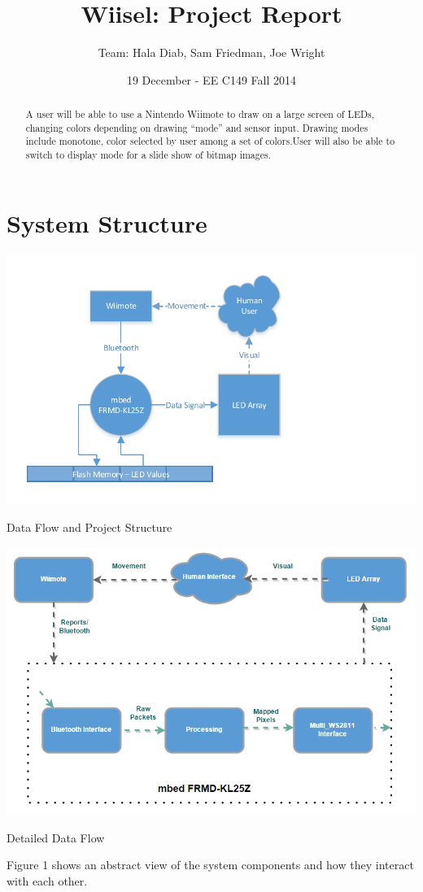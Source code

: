 \documentclass{tufte-handout}
\title{Wiisel: Project Report}
\author{Team: Hala Diab, Sam Friedman, Joe Wright}
\date{19 December - EE C149 Fall 2014}
\begin{document}
\maketitle
\begin{abstract}
    A user will be able to use a Nintendo Wiimote to draw on a large screen of
LEDs, changing colors depending
on drawing ``mode'' and sensor input. Drawing modes include monotone, color selected by user among a set of colors.User will also be able to switch to display mode for a slide show of bitmap images.
\end{abstract}

\section{\textbf{System Structure}}
\begin{marginfigure}
    \includegraphics[trim=1cm 0cm 4cm 0cm, width=\linewidth]{dataflow.pdf}
    \caption{Data Flow and Project Structure}
\end{marginfigure}
\begin{marginfigure}
    \includegraphics[trim=3cm 0cm 4cm 0cm, width=\linewidth]{dataflow1.png}
    \caption{Detailed Data Flow}
\end{marginfigure}
Figure 1 shows an abstract view of the system components and how they interact with each other.
\end{document}
